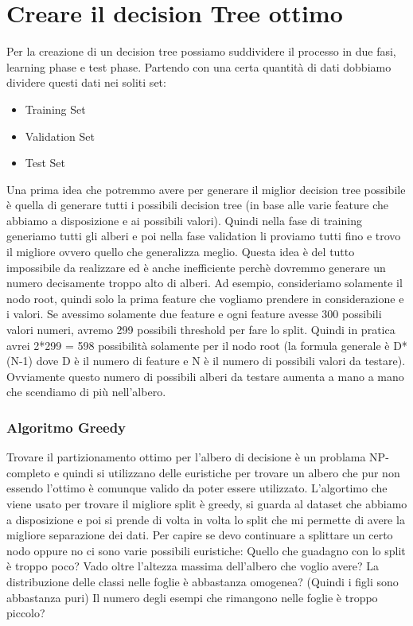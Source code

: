 \documentclass[14pt]{extreport}
\begin{document}
		\section{Creare il decision Tree ottimo}

		Per la creazione di un decision tree possiamo suddividere il processo in due fasi, learning phase e test phase. Partendo con una certa quantità di dati dobbiamo dividere questi dati nei soliti set: 
		\begin{itemize}
			\item Training Set
			\item Validation Set
			\item Test Set
			
			\end{itemize} 
		
			Una prima idea che potremmo avere per generare il miglior decision tree possibile è quella di generare tutti i possibili decision tree (in base alle varie feature che abbiamo a disposizione e ai possibili valori). Quindi nella fase di training generiamo tutti gli alberi e poi nella fase validation li proviamo tutti fino e trovo il migliore ovvero quello che generalizza meglio.
Questa idea è del tutto impossibile da realizzare ed è anche inefficiente perchè dovremmo generare un numero decisamente troppo alto di alberi.
Ad esempio, consideriamo solamente il nodo root, quindi solo la prima feature che vogliamo prendere in considerazione e i valori. Se avessimo solamente due feature e ogni feature avesse 300 possibili valori numeri, avremo 299 possibili threshold per fare lo split. Quindi in pratica avrei 2*299 = 598 possibilità solamente per il nodo root (la formula generale è D*(N-1) dove D è il numero di feature e N è il numero di possibili valori da testare).
Ovviamente questo numero di possibili alberi da testare aumenta a mano a mano che scendiamo di più nell’albero.

\subsubsection{Algoritmo Greedy}

Trovare il partizionamento ottimo per l’albero di decisione è un problama NP-completo e quindi si utilizzano delle euristiche per trovare un albero che pur non essendo l’ottimo è comunque valido da poter essere utilizzato.
L’algortimo che viene usato per trovare il migliore split è greedy, si guarda al dataset che abbiamo a disposizione e poi si prende di volta in volta lo split che mi permette di avere la migliore separazione dei dati. 
Per capire se devo continuare a splittare un certo nodo oppure no ci sono varie possibili euristiche:
Quello che guadagno con lo split è troppo poco?
Vado oltre l’altezza massima dell’albero che voglio avere?
La distribuzione delle classi nelle foglie è abbastanza omogenea? (Quindi i figli sono abbastanza puri)
Il numero degli esempi che rimangono nelle foglie è troppo piccolo?
\end{document}
